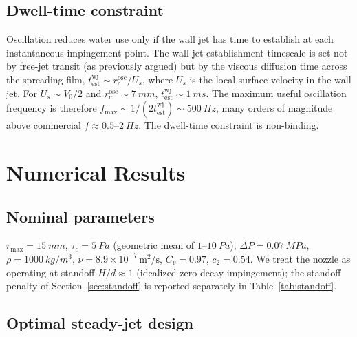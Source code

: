 \documentclass[10pt,letterpaper]{article}
\begin{document}
\subsection{Dwell-time constraint}

Oscillation reduces water use only if the wall jet has time to establish
at each instantaneous impingement point. The wall-jet establishment
timescale is set not by free-jet transit (as previously argued) but by
the viscous diffusion time across the spreading film,
$t_\mathrm{est}^\mathrm{wj} \sim r_c^\mathrm{osc}/U_s$, where
$U_s$ is the local surface velocity in the wall jet. For $U_s \sim V_0/2$
and $r_c^\mathrm{osc} \sim 7~mm$, $t_\mathrm{est}^\mathrm{wj}
\sim 1~ms$. The maximum useful oscillation frequency is therefore
$f_\mathrm{max} \sim 1/(2 t_\mathrm{est}^\mathrm{wj}) \sim 500~Hz$,
many orders of magnitude above commercial $f \approx 0.5$--$2~Hz$.
The dwell-time constraint is non-binding.

\section{Numerical Results}
\label{sec:numerics}

\subsection{Nominal parameters}

$r_\mathrm{max} = 15~mm$, $\tau_c = 5~Pa$ (geometric mean of
$1$--$10~Pa$), $\Delta P = 0.07~MPa$, $\rho = 1000~kg/m^3$,
$\nu = 8.9\times 10^{-7}\,\mathrm{m^2/s}$, $C_v = 0.97$, $c_2 = 0.54$.
We treat the nozzle as operating at standoff $H/d \approx 1$ (idealized
zero-decay impingement); the standoff penalty of Section~\ref{sec:standoff}
is reported separately in Table~\ref{tab:standoff}.

\subsection{Optimal steady-jet design}
\end{document}

